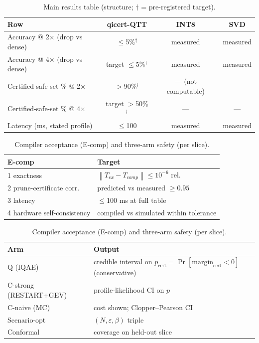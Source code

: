 \documentclass[conference,10pt]{IEEEtran}
\newcommand{\norm}[1]{\left\lVert #1 \right\rVert}
\begin{document}
\begin{table}[!t]
\caption{Main results table (structure; $\dagger$ = pre-registered target).}
\label{tab:main}
\centering
\small
\begin{tabular}{@{}lccc@{}}
\toprule
\textbf{Row} & \textbf{qicert-QTT} & \textbf{INT8} & \textbf{SVD} \\
\midrule
Accuracy @ 2$\times$ (drop vs dense) & $\le$5\%$^{\dagger}$ & measured & measured \\
Accuracy @ 4$\times$ (drop vs dense) & target $\le$5\%$^{\dagger}$ & measured & measured \\
Certified-safe-set \% @ 2$\times$ & $>$90\%$^{\dagger}$ & --- (not computable) & --- \\
Certified-safe-set \% @ 4$\times$ & target $>$50\%$^{\dagger}$ & --- & --- \\
Latency (ms, stated profile) & $\le$100 & measured & measured \\
\bottomrule
\end{tabular}
\end{table}

\begin{table}[!t]
\caption{Compiler acceptance (E-comp) and three-arm safety (per slice).}
\label{tab:compacc}
\centering
\small
\begin{tabular}{@{}ll@{}}
\toprule
\textbf{E-comp} & \textbf{Target} \\
\midrule
1 exactness & $\norm{T_{ex}-T_{comp}}\le 10^{-6}$ rel. \\
2 prune-certificate corr. & predicted vs measured $\ge 0.95$ \\
3 latency & $\le$100 ms at full table \\
4 hardware self-consistency & compiled vs simulated within tolerance \\
\bottomrule
\end{tabular}
\vspace{2mm}
\begin{tabular}{@{}ll@{}}
\toprule
\textbf{Arm} & \textbf{Output} \\
\midrule
Q (IQAE) & credible interval on $p_{\mathrm{cert}}=\Pr[\mathrm{margin}_{\mathrm{cert}}<0]$ (conservative) \\
C-strong (RESTART+GEV) & profile-likelihood CI on $p$ \\
C-naive (MC) & cost shown; Clopper--Pearson CI \\
Scenario-opt & $(N,\varepsilon,\beta)$ triple \\
Conformal & coverage on held-out slice \\
\bottomrule
\end{tabular}
\end{table}
\end{document}
